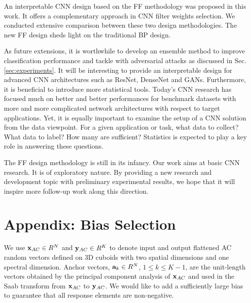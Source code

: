 \documentclass[preprint,12pt]{elsarticle}
\begin{document}
An interpretable CNN design based on the FF methodology was proposed in
this work. It offers a complementary approach in CNN filter weights
selection. We conducted extensive comparison between these two design
methodologies. The new FF design sheds light on the traditional BP
design. 

As future extensions, it is worthwhile to develop an ensemble method to
improve classification performance and tackle with adversarial attacks
as discussed in Sec. \ref{sec:experiments}.  It will be interesting to
provide an interpretable design for advanced CNN architectures such as
ResNet, DenseNet and GANs.  Furthermore, it is beneficial to introduce
more statistical tools.  Today's CNN research has focused much on better
and better performances for benchmark datasets with more and more
complicated network architectures with respect to target applications.
Yet, it is equally important to examine the setup of a CNN solution from
the data viewpoint. For a given application or task, what data to
collect?  What data to label?  How many are sufficient?  Statistics is
expected to play a key role in answering these questions. 

The FF design methodology is still in its infancy.  Our work aims at
basic CNN research. It is of exploratory nature.  By providing a new
research and development topic with preliminary experimental results, we
hope that it will inspire more follow-up work along this direction. 

\section*{Appendix: Bias Selection}\label{subsec:saab}

We use ${\bf x}_{AC} \in R^N$ and ${\bf y}_{AC} \in R^K$ to denote input
and output flattened AC random vectors defined on 3D cuboids with two
spatial dimensions and one spectral dimension.  Anchor vectors, ${\bf
a}_k \in R^N$, $1 \le k \le K-1$, are the unit-length vectors obtained
by the principal component analysis of ${\bf x}_{AC}$ and used in the
Saab transform from ${\bf x}_{AC}$ to ${\bf y}_{AC}$.  We would like to
add a sufficiently large bias to guarantee that all response elements
are non-negative. 
\end{document}
